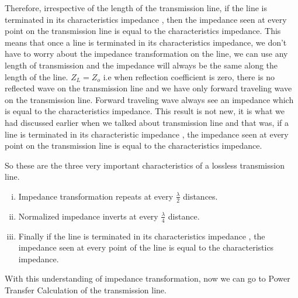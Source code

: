 \begin{enumerate}[(i)]
Therefore, irrespective of the length of the transmission line, if the line is terminated in its characteristics impedance , then the impedance seen at every point on the transmission line is equal to the characteristics impedance. This means that once a line is terminated in its characteristics impedance, we don't have to worry about the impedance transformation on the line, we can use any length of transmission and the impedance will always be the same along the length of the line. $Z_L=Z_o$ i.e when reflection coefficient is zero, there is no reflected wave on the transmission line and we have only forward traveling wave on the transmission line. Forward traveling wave always see an impedance which is equal to the characteristics impedance. This result is not new, it is what we had discussed earlier when we talked about transmission line and that was, if a line is terminated in its characteristic impedance , the impedance seen at every point on the transmission line is equal to the characteristics impedance. 
\end{enumerate}
So these are the three very important characteristics of a lossless transmission line.
\begin{enumerate}[(i)]
\item Impedance transformation repeats at every $\frac{\lambda}{2}$ distances.
\item Normalized impedance inverts at every $\frac{\lambda}{4}$ distance.
\item Finally if the line is terminated in its characteristics impedance , the impedance seen at every point of the line is equal to the characteristics impedance.
\end{enumerate}
With this understanding of impedance transformation, now we can go to Power Transfer Calculation of the transmission line.

